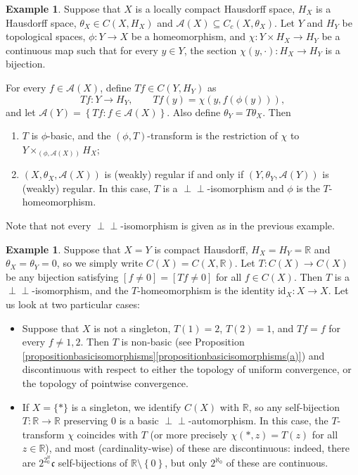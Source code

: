 \documentclass[letter,11pt]{amsart}
\theoremstyle{plain}		\newtheorem{theorem}[generalnumbering]{Theorem}
\theoremstyle{plain}		\newtheorem{corollary}[generalnumbering]{Corollary}
\theoremstyle{definition}		\newtheorem{definition}[generalnumbering]{Definition}
\theoremstyle{definition}		\newtheorem{example}[generalnumbering]{Example}
\theoremstyle{plain}		\newtheorem{proposition}[generalnumbering]{Proposition}
\theoremstyle{plain}		\newtheorem{lemma}[generalnumbering]{Lemma}
\theoremstyle{plain}    \newtheorem{plainstyle}[generalnumbering]{\namefordifferentenvironment}
\theoremstyle{plain}    \newtheorem*{plainstyle*}{\namefordifferentenvironment}
\theoremstyle{definition}    \newtheorem{definitionstyle}[generalnumbering]{\namefordifferentenvironment}
\theoremstyle{definition}    \newtheorem*{definitionstyle*}{\namefordifferentenvironment}
\newcommand{\perpp}{\perp\!\!\!\perp}
\newcommand{\id}{\mathrm{id}}
\begin{document}
\begin{example}
	Suppose that $X$ is a locally compact Hausdorff space, $H_X$ is a Hausdorff space, $\theta_X\in C(X,H_X)$ and $\mathcal{A}(X)\subseteq C_c(X,\theta_X)$. Let $Y$ and $H_Y$ be topological spaces, $\phi\colon Y\to X$ be a homeomorphism, and $\chi\colon Y\times H_X\to H_Y$ be a continuous map such that for every $y\in Y$, the section $\chi(y,\cdot)\colon H_X\to H_Y$ is a bijection.
	
	For every $f\in\mathcal{A}(X)$, define $Tf\in C(Y,H_Y)$ as
	\[Tf\colon Y\to H_Y,\qquad Tf(y)=\chi(y,f(\phi(y))),\]
	and let $\mathcal{A}(Y)=\left\{Tf\colon f\in\mathcal{A}(X)\right\}$. Also define $\theta_Y=T\theta_X$. Then
	\begin{enumerate}[label=\arabic*.]
		\item $T$ is $\phi$-basic, and the $(\phi,T)$-transform is the restriction of $\chi$ to $Y\times_{(\phi,\mathcal{A}(X))} H_X$;
		\item $(X,\theta_X,\mathcal{A}(X))$ is (weakly) regular if and only if $(Y,\theta_Y,\mathcal{A}(Y))$ is (weakly) regular. In this case, $T$ is a $\perpp$-isomorphism and $\phi$ is the $T$-homeomorphism.
	\end{enumerate}
\end{example}

Note that not every $\perpp$-isomorphism is given as in the previous example.

\begin{example}
	Suppose that $X=Y$ is compact Hausdorff, $H_X=H_Y=\mathbb{R}$ and $\theta_X=\theta_Y=0$, so we simply write $C(X)=C(X,\mathbb{R})$. Let $T\colon C(X)\to C(X)$ be any bijection satisfying $[f\neq 0]=[Tf\neq 0]$ for all $f\in C(X)$. Then $T$ is a $\perpp$-isomorphism, and the $T$-homeomorphism is the identity $\id_X\colon X\to X$. Let us look at two particular cases:
	\begin{itemize}
		\item Suppose that $X$ is not a singleton, $T(1)=2$, $T(2)=1$, and $Tf=f$ for every $f\neq 1,2$. Then $T$ is non-basic (see Proposition \ref{propositionbasicisomorphisms}\ref{propositionbasicisomorphisms(a)}) and discontinuous with respect to either the topology of uniform convergence, or the topology of pointwise convergence.
		
		\item If $X=\{\ast\}$ is a singleton, we identify $C(X)$ with $\mathbb{R}$, so any self-bijection $T\colon\mathbb{R}\to\mathbb{R}$ preserving $0$ is a basic $\perpp$-automorphism. In this case, the $T$-transform $\chi$ coincides with $T$ (or more precisely $\chi(\ast,z)=T(z)$ for all $z\in\mathbb{R}$), and most (cardinality-wise) of these are discontinuous: indeed, there are $2^{2^\aleph_0}\mathfrak{c}$ self-bijections of $\mathbb{R}\setminus\left\{0\right\}$, but only $2^{\aleph_0}$ of these are continuous.
	\end{itemize}
\end{example}
\end{document}
